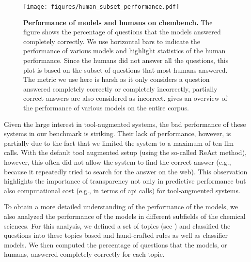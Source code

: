 \documentclass[11pt, oneside]{article}
\begin{document}
\begin{figure}
    \centering
    \texttt{[image: figures/human\_subset\_performance.pdf]}
    \caption{\textbf{Performance of models and humans on chembench.} The figure shows the percentage of questions that the models answered completely correctly. We use horizontal bars to indicate the performance of various models and highlight statistics of the human performance. 
    Since the humans did not answer all the questions, this plot is based on the subset of questions that most humans answered.
    The metric we use here is harsh as it only considers a question answered completely correctly or completely incorrectly, partially correct answers are also considered as incorrect.
     gives an overview of the performance of various models on the entire corpus.
    }
    \label{fig:human_vs_models_bar}
\end{figure}

Given the large interest in tool-augmented systems, the bad performance of these systems in our benchmark is striking. 
Their lack of performance, however, is partially due to the fact that we limited the system to a maximum of ten \gls{llm} calls.
With the default tool augmented setup (using the so-called ReAct method\cite{yao2023react}), however, this often did not allow the system to find the correct answer (e.g., because it repeatedly tried to search for the answer on the web).
This observation highlights the importance of transparency not only in predictive performance but also computational cost (e.g., in terms of \gls{api} calls) for tool-augmented systems.


To obtain a more detailed understanding of the performance of the models, we also analyzed the performance of the models in different subfields of the chemical sciences.
For this analysis, we defined a set of topics (see ) and classified the questions into these topics based and hand-crafted rules as well as classifier models.
We then computed the percentage of questions that the models, or humans, answered completely correctly for each topic.
\end{document}

